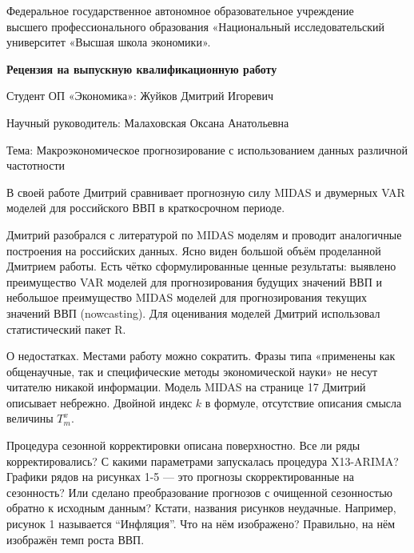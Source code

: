 \documentclass[a4paper, 12pt]{article}
\begin{document}
\begin{center}
{\small Федеральное государственное автономное образовательное учреждение\\ 
высшего профессионального образования «Национальный исследовательский\\ 
университет «Высшая школа экономики».}
\end{center}

\vspace{0.4cm}

\begin{center}
\textbf{Рецензия на выпускную квалификационную работу}
\end{center}

\vspace{0.4cm}

Студент ОП «Экономика»: Жуйков Дмитрий Игоревич

\vspace{0.4cm}

Научный руководитель: Малаховская Оксана Анатольевна

\vspace{0.4cm}

Тема: Макроэкономическое прогнозирование с использованием данных различной
частотности

\vspace{0.4cm}

В своей работе Дмитрий сравнивает прогнозную силу MIDAS и двумерных VAR
моделей для российского ВВП в краткосрочном периоде.

Дмитрий разобрался с литературой по MIDAS моделям и проводит аналогичные
построения на российских данных. Ясно виден большой объём проделанной
Дмитрием работы. Есть чётко сформулированные ценные результаты: выявлено
преимущество VAR моделей для прогнозирования будущих значений ВВП и
небольшое преимущество MIDAS моделей для прогнозирования текущих
значений ВВП (nowcasting). Для оценивания моделей Дмитрий использовал
статистический пакет R.

О недостатках. Местами работу можно сократить. Фразы типа «применены как
общенаучные, так и специфические методы экономической науки» не несут
читателю никакой информации. Модель MIDAS на странице 17 Дмитрий
описывает небрежно. Двойной индекс \(k\) в формуле, отсутствие описания
смысла величины \(T_m^x\).

Процедура сезонной корректировки описана поверхностно. Все ли ряды
корректировались? С какими параметрами запускалась процедура X13-ARIMA?
Графики рядов на рисунках 1-5 --- это прогнозы скорректированные на
сезонность? Или сделано преобразование прогнозов с очищенной сезонностью
обратно к исходным данным? Кстати, названия рисунков неудачные.
Например, рисунок 1 называется ``Инфляция''. Что на нём изображено?
Правильно, на нём изображён темп роста ВВП.
\end{document}
